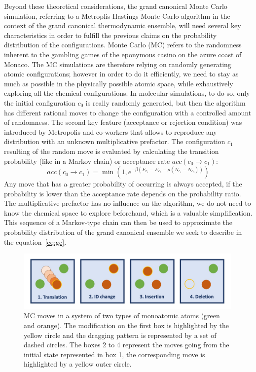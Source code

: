 \documentclass[main.tex]{subfiles}
\begin{document}
Beyond these theoretical considerations, the grand canonical Monte Carlo simulation, referring to a Metroplis-Hastings Monte Carlo algorithm in the context of the grand canonical thermodynamic ensemble, will need several key characteristics in order to fulfill the previous claims on the probability distribution of the configurations. Monte Carlo (MC) refers to the randomness inherent to the gambling games of the eponymous casino on the azure coast of Monaco. The MC simulations are therefore relying on randomly generating atomic configurations; however in order to do it efficiently, we need to stay as much as possible in the physically possible atomic space, while exhaustively exploring all the chemical configurations. 
In molecular simulations, to do so, only the initial configuration $c_0$ is really randomly generated, but then the algorithm has different rational moves to change the configuration with a controlled amount of randomness. The second key feature (acceptance or rejection condition) was introduced by Metropolis and co-workers that allows to reproduce any distribution with an unknown multiplicative prefactor.\autocite{Metropolis1949} The configuration $c_1$ resulting of the random move is evaluated by calculating the transition probability (like in a Markov chain) or acceptance rate $acc(c_0 \rightarrow c_1)$: 
\begin{equation}
  acc(c_0 \rightarrow c_1) = \min\left(1, e^{-\beta\left(E_{c_1}-E_{c_0}-\mu \left(N_{c_1}-N_{c_0}\right)\right) }\right)
\end{equation}
Any move that has a greater probability of occurring is always accepted, if the probability is lower than the acceptance rate depends on the probability ratio.
The multiplicative prefactor has no influence on the algorithm, we do not need to know the chemical space to explore beforehand, which is a valuable simplification. This sequence of a Markov-type chain can then be used to approximate the probability distribution of the grand canonical ensemble we seek to describe in the equation~\ref{eq:gc}.

\begin{figure}[ht]
  \centering
  \includegraphics[width=0.99\textwidth]{figures/2-thermo/MC_moves.jpg}
  \caption{MC moves in a system of two types of monoatomic atoms (green and orange). The modification on the first box is highlighted by the yellow circle and the dragging pattern is represented by a set of dashed circles. The boxes 2 to 4 represent the moves going from the initial state represented in box 1, the corresponding move is highlighted by a yellow outer circle. }\label{fgr:mc}
\end{figure}
\end{document}
